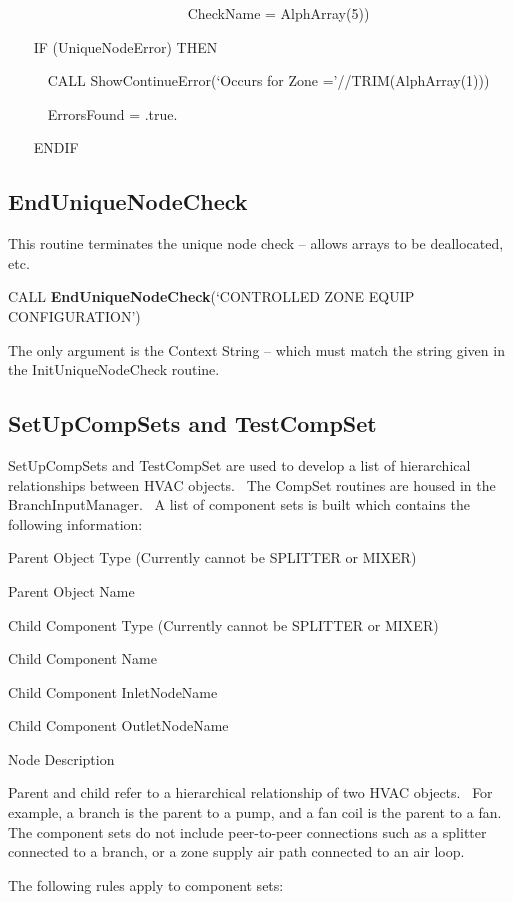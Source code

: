 ~~~~~~~~~~~~~~~~~~~~~~~~~ CheckName = AlphArray(5))

~~~ IF (UniqueNodeError) THEN

~~~~~ CALL ShowContinueError(`Occurs for Zone ='//TRIM(AlphArray(1)))

~~~~~ ErrorsFound = .true.

~~~ ENDIF

\subsection{EndUniqueNodeCheck}\label{enduniquenodecheck}

This routine terminates the unique node check -- allows arrays to be deallocated, etc.

CALL \textbf{EndUniqueNodeCheck}(`CONTROLLED ZONE EQUIP CONFIGURATION')

The only argument is the Context String -- which must match the string given in the InitUniqueNodeCheck routine.

\subsection{SetUpCompSets and TestCompSet}\label{setupcompsets-and-testcompset}

SetUpCompSets and TestCompSet are used to develop a list of hierarchical relationships between HVAC objects.~ The CompSet routines are housed in the BranchInputManager.~ A list of component sets is built which contains the following information:

Parent Object Type (Currently cannot be SPLITTER or MIXER)

Parent Object Name

Child Component Type (Currently cannot be SPLITTER or MIXER)

Child Component Name

Child Component InletNodeName

Child Component OutletNodeName

Node Description

Parent and child refer to a hierarchical relationship of two HVAC objects.~ For example, a branch is the parent to a pump, and a fan coil is the parent to a fan.~ The component sets do not include peer-to-peer connections such as a splitter connected to a branch, or a zone supply air path connected to an air loop.

The following rules apply to component sets:

